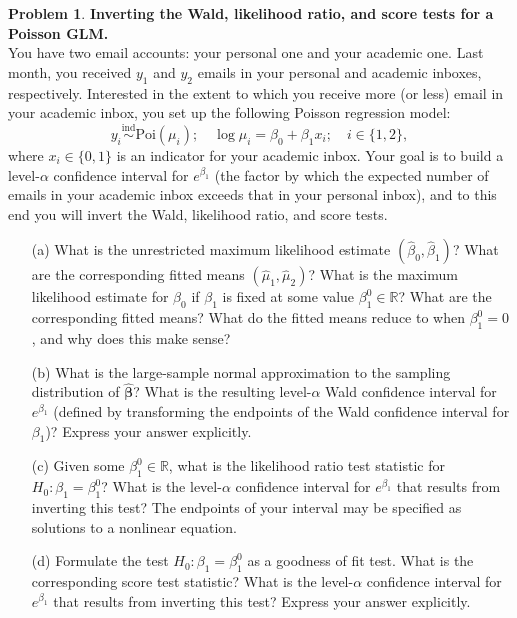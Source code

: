 \documentclass[11pt,letterpaper,english,oneside]{article} %
\theoremstyle{definition} %
\newtheorem{problem}{Problem}
\newenvironment{prob}{\clearpage \begin{problem}\hspace{0pt}}{\end{problem}}
\begin{document}
\begin{prob} \label{prob:ci-calculation}\textbf{Inverting the Wald, likelihood ratio, and score tests for a Poisson GLM.} \\

    \noindent You have two email accounts: your personal one and your academic one. Last month, you received $y_1$ and $y_2$ emails in your personal and academic inboxes, respectively. Interested in the extent to which you receive more (or less) email in your academic inbox, you set up the following Poisson regression model:
    \begin{equation*}
    y_i \overset{\text{ind}} \sim \text{Poi}(\mu_i); \quad \log \mu_i = \beta_0 + \beta_1 x_i; \quad i \in \{1,2\},
    \end{equation*}
    where $x_i \in \{0,1\}$ is an indicator for your academic inbox. Your goal is to build a level-$\alpha$ confidence interval for $e^{\beta_1}$ (the factor by which the expected number of emails in your academic inbox exceeds that in your personal inbox), and to this end you will invert the Wald, likelihood ratio, and score tests.
    
    \begin{enumerate}
    
    \item[(a)] What is the unrestricted maximum likelihood estimate $(\widehat \beta_0, \widehat \beta_1)$? What are the corresponding fitted means $(\widehat \mu_1, \widehat \mu_2)$? What is the maximum likelihood estimate for $\beta_0$ if $\beta_1$ is fixed at some value $\beta_1^0 \in \mathbb R$? What are the corresponding fitted means? What do the fitted means reduce to when $\beta_1^0 = 0$, and why does this make sense?
    
    \item[(b)] What is the large-sample normal approximation to the sampling distribution of $\bm{\widehat \beta}$? What is the resulting level-$\alpha$ Wald confidence interval for $e^{\beta_1}$ (defined by transforming the endpoints of the Wald confidence interval for $\beta_1$)? Express your answer explicitly.
    
    \item[(c)] Given some $\beta_1^0 \in \mathbb R$, what is the likelihood ratio test statistic for $H_0: \beta_1 = \beta_1^0$? What is the level-$\alpha$ confidence interval for $e^{\beta_1}$ that results from inverting this test? The endpoints of your interval may be specified as solutions to a nonlinear equation.
    
    \item[(d)] Formulate the test $H_0: \beta_1 = \beta_1^0$ as a goodness of fit test. What is the corresponding score test statistic? What is the level-$\alpha$ confidence interval for $e^{\beta_1}$ that results from inverting this test? Express your answer explicitly.
    
    
    \end{enumerate}
    
\end{prob}
    
\end{document}
